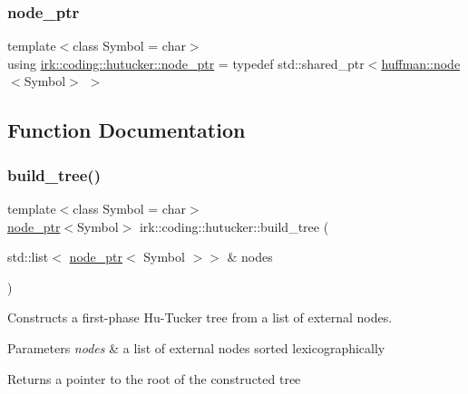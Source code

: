 \subsubsection{\texorpdfstring{node\+\_\+ptr}{node\_ptr}}
{\footnotesize\ttfamily template$<$class Symbol  = char$>$ \\
using \mbox{\hyperlink{namespaceirk_1_1coding_1_1hutucker_aa5d22cfdf05ffec38f2531e0307248fe}{irk\+::coding\+::hutucker\+::node\+\_\+ptr}} = typedef std\+::shared\+\_\+ptr$<$\mbox{\hyperlink{structirk_1_1coding_1_1huffman_1_1node}{huffman\+::node}}$<$Symbol$>$ $>$}



\subsection{Function Documentation}
\mbox{\label{namespaceirk_1_1coding_1_1hutucker_ae962db3e3b0d823d81dd74c57e129887}} 
\subsubsection{\texorpdfstring{build\+\_\+tree()}{build\_tree()}}
{\footnotesize\ttfamily template$<$class Symbol  = char$>$ \\
\mbox{\hyperlink{namespaceirk_1_1coding_1_1hutucker_aa5d22cfdf05ffec38f2531e0307248fe}{node\+\_\+ptr}}$<$Symbol$>$ irk\+::coding\+::hutucker\+::build\+\_\+tree (\begin{DoxyParamCaption}\item[{std\+::list$<$ \mbox{\hyperlink{namespaceirk_1_1coding_1_1hutucker_aa5d22cfdf05ffec38f2531e0307248fe}{node\+\_\+ptr}}$<$ Symbol $>$$>$ \&}]{nodes }\end{DoxyParamCaption})}



Constructs a first-\/phase Hu-\/\+Tucker tree from a list of external nodes. 


\begin{DoxyParams}{Parameters}
{\em nodes} & a list of external nodes sorted lexicographically \\
\hline
\end{DoxyParams}
\begin{DoxyReturn}{Returns}
a pointer to the root of the constructed tree 
\end{DoxyReturn}
\mbox{\label{namespaceirk_1_1coding_1_1hutucker_ae322fefb34195e8581517ef1044be234}} 

